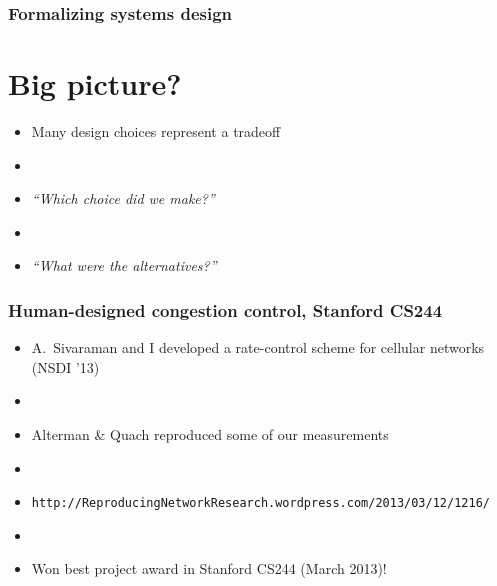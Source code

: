 \documentclass[svgnames]{beamer}
\begin{document}
\begin{frame}
\frametitle{Formalizing systems design}

\section{Big picture?}

\begin{itemize}

\item Many design choices represent a tradeoff

\item[]

\item \emph{``Which choice did we make?''}

\item[]

\item \emph{``What were the alternatives?''}

\end{itemize}

\end{frame}

\begin{frame}
\frametitle{Human-designed congestion control, Stanford CS244}

\begin{itemize}
\item A.~Sivaraman and I developed a rate-control scheme for cellular networks (NSDI '13)

\item[]

\item Alterman \& Quach reproduced some of our measurements

\item[]

\item {\scriptsize\texttt{http://ReproducingNetworkResearch.wordpress.com/2013/03/12/1216/}}

\item[]

\item Won best project award in Stanford CS244 (March 2013)!

\end{itemize}

\end{frame}
\end{document}
